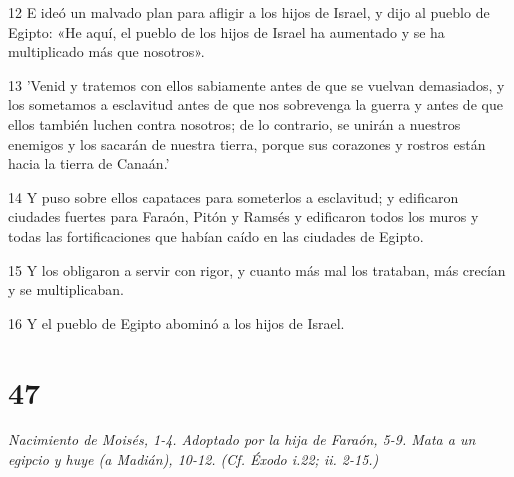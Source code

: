 \par 12 E ideó un malvado plan para afligir a los hijos de Israel, y dijo al pueblo de Egipto: «He aquí, el pueblo de los hijos de Israel ha aumentado y se ha multiplicado más que nosotros».
\par 13 'Venid y tratemos con ellos sabiamente antes de que se vuelvan demasiados, y los sometamos a esclavitud antes de que nos sobrevenga la guerra y antes de que ellos también luchen contra nosotros; de lo contrario, se unirán a nuestros enemigos y los sacarán de nuestra tierra, porque sus corazones y rostros están hacia la tierra de Canaán.'
\par 14 Y puso sobre ellos capataces para someterlos a esclavitud; y edificaron ciudades fuertes para Faraón, Pitón y Ramsés y edificaron todos los muros y todas las fortificaciones que habían caído en las ciudades de Egipto.
\par 15 Y los obligaron a servir con rigor, y cuanto más mal los trataban, más crecían y se multiplicaban.
\par 16 Y el pueblo de Egipto abominó a los hijos de Israel.

\chapter{47}

\par \textit{Nacimiento de Moisés, 1-4. Adoptado por la hija de Faraón, 5-9. Mata a un egipcio y huye (a Madián), 10-12. (Cf. Éxodo i.22; ii. 2-15.)}

